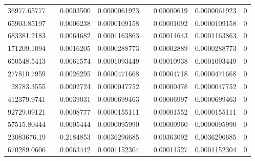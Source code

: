 \documentclass[
journal=jacsat, %
manuscript=article]{achemso}
\begin{document}
\begin{table}[htbp]
{\begin{tabular}{rrrrrrrr}
    36977.65777 &       & 0.0003500 & 0.0000061923 &       & 0.00000619 & 0.0000061923 & 0 \\
    65903.85197 &       & 0.0006238 & 0.0000109158 &       & 0.00001092 & 0.0000109158 & 0 \\
    683381.2183 &       & 0.0064682 & 0.0001163863 &       & 0.00011643 & 0.0001163863 & 0 \\
    171209.1094 &       & 0.0016205 & 0.0000288773 &       & 0.00002889 & 0.0000288773 & 0 \\
    650548.5413 &       & 0.0061574 & 0.0001093449 &       & 0.00010938 & 0.0001093449 & 0 \\
    277810.7959 &       & 0.0026295 & 0.0000471668 &       & 0.00004718 & 0.0000471668 & 0 \\
    28783.3555 &       & 0.0002724 & 0.0000047752 &       & 0.00000478 & 0.0000047752 & 0 \\
    412379.9741 &       & 0.0039031 & 0.0000699463 &       & 0.00006997 & 0.0000699463 & 0 \\
    92729.09121 &       & 0.0008777 & 0.0000155111 &       & 0.00001552 & 0.0000155111 & 0 \\
    57515.80444 &       & 0.0005444 & 0.0000095990 &       & 0.00000960 & 0.0000095990 & 0 \\
    23083676.19 &       & 0.2184853 & 0.0036296685 &       & 0.00363092 & 0.0036296685 & 0 \\
    670289.0606 &       & 0.0063442 & 0.0001152304 &       & 0.00011527 & 0.0001152304 & 0 \\
      \bottomrule
    \end{tabular}%
    }
  \label{tab:addlabel}%
\end{table}%
\end{document}
